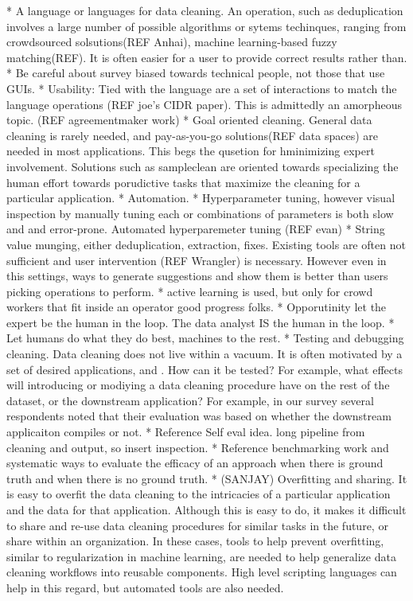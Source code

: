  
* A language or languages for data cleaning.  An operation, such as deduplication involves a large number of possible algorithms or sytems techinques, ranging from crowdsourced solsutions(REF Anhai), machine learning-based fuzzy matching(REF).  It is often easier for a user to provide correct results rather than.
* Be careful about survey biased towards technical people, not those that use GUIs. 
* Usability: Tied with the language are a set of interactions to match the language operations (REF joe’s CIDR paper).  This is admittedly an amorpheous topic.  (REF agreementmaker work)
* Goal oriented cleaning.  General data cleaning is rarely needed, and pay-as-you-go solutions(REF data spaces) are needed in most applications.   This begs the qusetion for hminimizing expert involvement.   Solutions such as sampleclean are oriented towards specializing the human effort towards porudictive tasks that maximize the cleaning for a particular application.  
* Automation. 
    * Hyperparameter tuning, however visual inspection by manually tuning each or combinations of parameters is both slow and and error-prone.  Automated hyperparemeter tuning (REF evan)
    * String value munging, either deduplication, extraction, fixes.  Existing tools are often not sufficient and user intervention (REF Wrangler) is necessary.  However even in this settings, ways to generate suggestions and show them is better than users picking operations to perform.
    * active learning is used, but only for crowd workers that fit inside an operator good progress folks.
    * Opporutinity let the expert be the human in the loop.  The data analyst IS the human in the loop.
    * Let humans do what they do best, machines to the rest.
* Testing and debugging cleaning.  Data cleaning does not live within a vacuum.  It is often motivated by a set of desired applications, and .  How can it be tested?  For example, what effects will introducing or modiying a data cleaning procedure have on the rest of the dataset, or the downstream application?  For example, in our survey several respondents noted that their evaluation was based on whether the downstream applicaiton compiles or not.
    * Reference Self eval idea.  long pipeline from cleaning and output, so insert inspection.  
    * Reference benchmarking work and systematic ways to evaluate the efficacy of an approach when there is ground truth and when there is no ground truth.
* (SANJAY) Overfitting and sharing.   It is easy to overfit the data cleaning to the intricacies of a particular application and the data for that application.  Although this is easy to do, it makes it difficult to share and re-use data cleaning procedures for similar tasks in the future, or share within an organization.  In these cases, tools to help prevent overfitting, similar to regularization in machine learning, are needed to help generalize data cleaning workflows into reusable components.  High level scripting languages can help in this regard, but automated tools are also needed.




